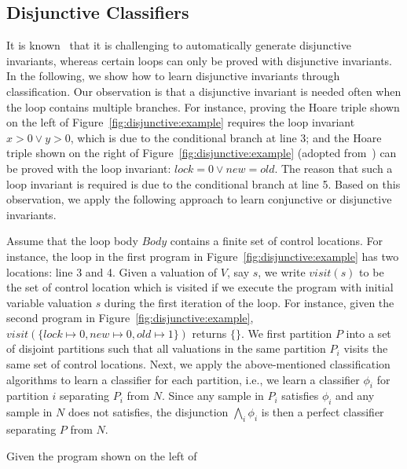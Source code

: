 \subsection{Disjunctive Classifiers}
It is known~\cite{DBLP:conf/cav/SharmaDDA11,DBLP:conf/pldi/GulwaniSV08} that it is challenging to automatically generate disjunctive invariants, whereas certain loops can only be proved with disjunctive invariants. In the following, we show how to learn disjunctive invariants through classification. Our observation is that a disjunctive invariant is needed often when the loop contains multiple branches. For instance, proving the Hoare triple shown on the left of Figure~\ref{fig:disjunctive:example} requires the loop invariant $x > 0 \lor y > 0$, which is due to the conditional branch at line 3; and the Hoare triple shown on the right of Figure~\ref{fig:disjunctive:example} (adopted from~\cite{DBLP:conf/popl/HenzingerJMS02}) can be proved with the loop invariant: $lock = 0 \lor new = old$. The reason that such a loop invariant is required is due to the conditional branch at line 5. Based on this observation, we apply the following approach to learn conjunctive or disjunctive invariants.

Assume that the loop body $Body$ contains a finite set of control locations. For instance, the loop in the first program in Figure~\ref{fig:disjunctive:example} has two locations: line 3 and 4. Given a valuation of $V$, say $s$, we write $visit(s)$ to be the set of control location which is visited if we execute the program with initial variable valuation $s$ during the first iteration of the loop. For instance, given the second program in Figure~\ref{fig:disjunctive:example}, $visit(\{lock \mapsto 0, new \mapsto 0, old \mapsto 1\})$ returns $\{\}$. We first partition $P$ into a set of disjoint partitions such that all valuations in the same partition $P_i$ visits the same set of control locations. Next, we apply the above-mentioned classification algorithms to learn a classifier for each partition, i.e., we learn a classifier $\phi_i$ for partition $i$ separating $P_i$ from $N$.
Since any sample in $P_i$ satisfies $\phi_i$ and any sample in $N$ does not satisfies, the disjunction $\bigwedge_i \phi_i$ is then a perfect classifier separating $P$ from $N$.

\begin{example}
Given the program shown on the left of
\end{example}

